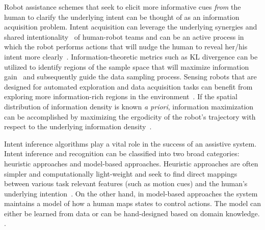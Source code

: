 \documentclass[letterpaper, 10 pt, conference]{ieeeconf}  %
\begin{document}
Robot assistance schemes that seek to elicit more informative cues \textit{from} the human to clarify the underlying intent can be thought of as an information acquisition problem. Intent acquisition can leverage the underlying synergies and shared intentionality~\cite{tomasello2007shared} of human-robot teams and can be an active process in which the robot performs actions 
that will nudge the human to reveal her/his intent more clearly~\cite{sadigh2016information}. Information-theoretic metrics such as KL divergence can be utilized to identify regions of the sample space that will maximize information gain~\cite{tong2001active} and subsequently guide the data sampling process. 
Sensing robots that are designed for automated exploration and data acquisition tasks can benefit from exploring more information-rich regions in the environment~\cite{atanasov2014information}. 
If the spatial distribution of information density is known \textit{a priori}, information maximization can be accomplished by maximizing the ergodicity of the robot's trajectory with respect to the underlying information density~\cite{miller2016ergodic}. 

Intent inference algorithms play a vital role in the success of an assistive system. Intent inference and recognition can be classified into two broad categories: heuristic approaches and model-based approaches. Heuristic approaches are often simpler and computationally light-weight and seek to find direct mappings between various task relevant features (such as motion cues) and the human's underlying intention~\cite{baker2007goal}. On the other hand, in model-based approaches the system maintains a model of how a human maps states to control actions. The model can either be learned from data or can be hand-designed based on domain knowledge. .
\end{document}
